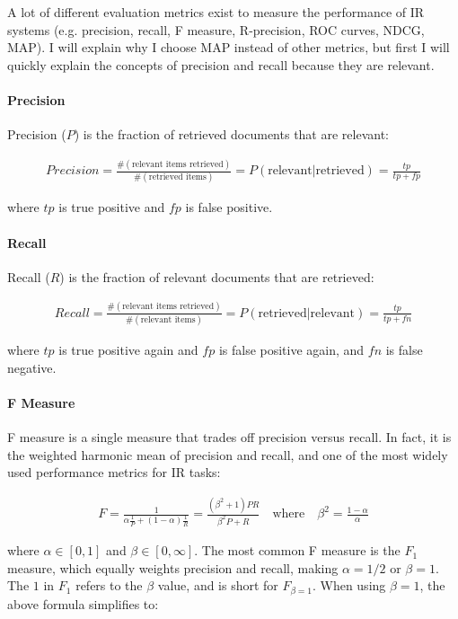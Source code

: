 A lot of different evaluation metrics exist to measure the performance of IR systems (e.g. precision, recall, F measure,
R-precision, ROC curves, NDCG, MAP). I will explain why I choose MAP instead of other metrics, but first I will quickly
explain the concepts of precision and recall because they are relevant.

\paragraph{Precision}
Precision ($P$) is the fraction of retrieved documents that are relevant:

\begin{gather}
  Precision = \frac{\#(\text{relevant items retrieved})}{\#(\text{retrieved items})} = P(\text{relevant}|\text{retrieved}) =
  \frac{tp}{tp + fp}
\end{gather}

where $tp$ is true positive and $fp$ is false positive.

\paragraph{Recall}
Recall ($R$) is the fraction of relevant documents that are retrieved:

\begin{gather}
  Recall = \frac{\#(\text{relevant items retrieved})}{\#(\text{relevant items})} = P(\text{retrieved}|\text{relevant}) =
  \frac{tp}{tp + fn}
\end{gather}

where $tp$ is true positive again and $fp$ is false positive again, and $fn$ is false negative.

\paragraph{F Measure}

F measure is a single measure that trades off precision versus recall. In fact, it is the weighted harmonic mean of precision and
recall, and one of the most widely used performance metrics for IR tasks:

\begin{gather}
  F = \frac{1}{\alpha \frac{1}{P} + (1 - \alpha) \frac{1}{R}} = \frac{({\beta}^2 + 1)PR}{{\beta}^2P + R} \quad \text{where} \quad
  {\beta}^2=\frac{1 - \alpha}{\alpha}
\end{gather}

where $\alpha \in [0, 1]$ and $\beta \in [0,\infty]$. The most common F measure is the $F_1$ measure, which equally weights precision
and recall, making $\alpha = 1/2$ or $\beta = 1$. The $1$ in $F_1$ refers to the $\beta$ value, and is short for $F_{\beta = 1}$.
When using $\beta = 1$, the above formula simplifies to:

